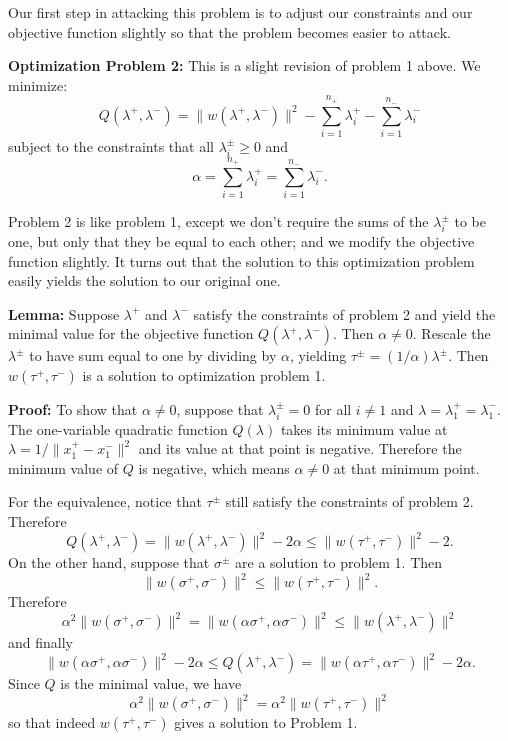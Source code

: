 \documentclass[
  oneside]{scrbook}
\begin{document}
Our first step in attacking this problem is to adjust our constraints
and our objective function slightly so that the problem becomes easier
to attack.

\textbf{Optimization Problem 2:} This is a slight revision of problem 1
above. We minimize: \[
Q(\lambda^{+},\lambda^{-}) = \|w(\lambda^{+},\lambda^{-})\|^2-\sum_{i=1}^{n_{+}}\lambda^{+}_{i}-\sum_{i=1}^{n_{-}}\lambda^{-}_{i}
\] subject to the constraints that all \(\lambda^{\pm}_{i}\ge 0\) and \[
\alpha = \sum_{i=1}^{n_{+}}\lambda^+_{i} = \sum_{i=1}^{n_{-}}\lambda^{-}_{i}.
\]

Problem 2 is like problem 1, except we don't require the sums of the
\(\lambda^{\pm}_{i}\) to be one, but only that they be equal to each
other; and we modify the objective function slightly. It turns out that
the solution to this optimization problem easily yields the solution to
our original one.

\textbf{Lemma:} Suppose \(\lambda^{+}\) and \(\lambda^{-}\) satisfy the
constraints of problem 2 and yield the minimal value for the objective
function \(Q(\lambda^{+},\lambda^{-})\). Then \(\alpha\not=0\). Rescale
the \(\lambda^{\pm}\) to have sum equal to one by dividing by
\(\alpha\), yielding \(\tau^{\pm}=(1/\alpha)\lambda^{\pm}\). Then
\(w(\tau^{+},\tau^{-})\) is a solution to optimization problem 1.

\textbf{Proof:} To show that \(\alpha\not=0\), suppose that
\(\lambda^{\pm}_{i}=0\) for all \(i\not=1\) and
\(\lambda=\lambda^{+}_{1}=\lambda^{-}_{1}\). The one-variable quadratic
function \(Q(\lambda)\) takes its minimum value at
\(\lambda=1/\|x_{1}^{+}-x_{1}^{-}\|^2\) and its value at that point is
negative. Therefore the minimum value of \(Q\) is negative, which means
\(\alpha\not=0\) at that minimum point.

For the equivalence, notice that \(\tau^{\pm}\) still satisfy the
constraints of problem 2. Therefore \[
Q(\lambda^{+},\lambda^{-}) = \|w(\lambda^{+},\lambda^{-})\|^2-2\alpha\le \|w(\tau^{+},\tau^{-})\|^2-2.
\] On the other hand, suppose that \(\sigma^{\pm}\) are a solution to
problem 1. Then \[
\|w(\sigma^{+},\sigma^{-})\|^2\le \|w(\tau^{+},\tau^{-})\|^2.
\] Therefore \[
\alpha^2 \|w(\sigma^{+},\sigma^{-})\|^2 = \|w(\alpha\sigma^{+},\alpha\sigma^{-})\|^2\le \|w(\lambda^{+},\lambda^{-})\|^2
\] and finally \[
\|w(\alpha\sigma^{+},\alpha\sigma^{-})\|^2-2\alpha\le Q(\lambda^{+},\lambda^{-})=\|w(\alpha\tau^{+},\alpha\tau^{-})\|^2-2\alpha.
\] Since \(Q\) is the minimal value, we have \[
\alpha^{2}\|w(\sigma^{+},\sigma^{-})\|^2 = \alpha^{2}\|w(\tau^{+},\tau^{-})\|^2
\] so that indeed \(w(\tau^{+},\tau^{-})\) gives a solution to Problem
1.
\end{document}
